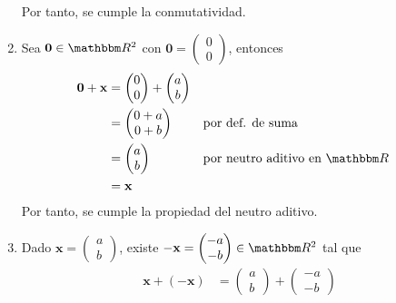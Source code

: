 \begin{examplebox}{}{}
\begin{enumerate}[label=\roman*), topsep=6pt, itemsep=0pt]
        Por tanto, se cumple la conmutatividad.
        \item Sea $\mathbf{0} \in \RR[2]$ con $\mathbf{0} = \begin{pmatrix}
            0 \\
            0
        \end{pmatrix}$, entonces
        \begin{align*}
            \mathbf{0} + \mathbf{x} & = \begin{pmatrix}
                0 \\
                0
            \end{pmatrix} + \begin{pmatrix}
                a \\
                b
            \end{pmatrix} \\
            & = \begin{pmatrix}
                0 + a \\
                0 + b
            \end{pmatrix} && \text{por def. de suma} \\
            & = \begin{pmatrix}
                a \\
                b
            \end{pmatrix} && \text{por neutro aditivo en $\RR$} \\
            & = \mathbf{x}
        \end{align*}
        Por tanto, se cumple la propiedad del neutro aditivo.
        \item Dado $\mathbf{x} = \begin{pmatrix}
            a \\
            b
        \end{pmatrix}$, existe $-\mathbf{x} = \begin{pmatrix}
            -a \\
            -b
        \end{pmatrix} \in \RR[2]$ tal que
        \begin{align*}
            \mathbf{x} + (-\mathbf{x}) & = \begin{pmatrix}
                a \\
                b
            \end{pmatrix} + \begin{pmatrix}
                -a \\
                -b
            \end{pmatrix} \\

\end{align*}
\end{enumerate}
\end{examplebox}
